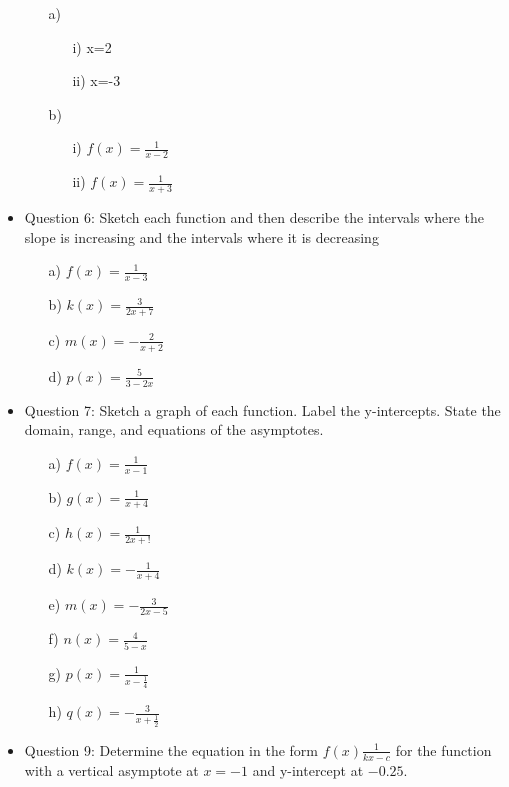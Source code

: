 \documentclass{article}
\begin{document}
\begin{itemize}
\begin{enumerate}
    \item[a)]
    \begin{enumerate}
        \item [i)] x=2
        \item [ii)] x=-3
    \end{enumerate}
    \item[b)]
    \begin{enumerate}
        \item[i)] $f(x)=\frac{1}{x-2}$ 
        \item[ii)] $f(x)=\frac{1}{x+3}$ 
    \end{enumerate}
\end{enumerate}
\item Question 6: Sketch each function and then describe the intervals where the slope is increasing and the intervals where it is decreasing 
\begin{enumerate}
    \item[a)]$f(x)=\frac{1}{x-3}$
    \item[b)]$k(x)=\frac{3}{2x+7}$
    \item[c)]$m(x)=-\frac{2}{x+2}$
    \item[d)]$p(x)=\frac{5}{3-2x}$ 
\end{enumerate}
\item Question 7: Sketch a graph of each function. Label the y-intercepts. State the domain, range, and equations of the asymptotes.
\begin{enumerate}
    \item[a)] $f(x)=\frac{1}{x-1}$
    \item[b)] $g(x)=\frac{1}{x+4}$
    \item[c)] $h(x)=\frac{1}{2x+!}$ 
    \item[d)] $k(x)=-\frac{1}{x+4}$
    \item[e)] $m(x)=-\frac{3}{2x-5}$
    \item[f)] $n(x)=\frac{4}{5-x}$
    \item[g)] $p(x)=\frac{1}{x-\frac{1}{4}}$
    \item[h)] $q(x)=-\frac{3}{x+\frac{1}{2}}$
\end{enumerate}
\item Question 9: Determine the equation in the form $f(x)\frac{1}{kx-c}$ for the function with a vertical asymptote at $x=-1$ and y-intercept at $-0.25$. 


\end{itemize}
\end{document}
